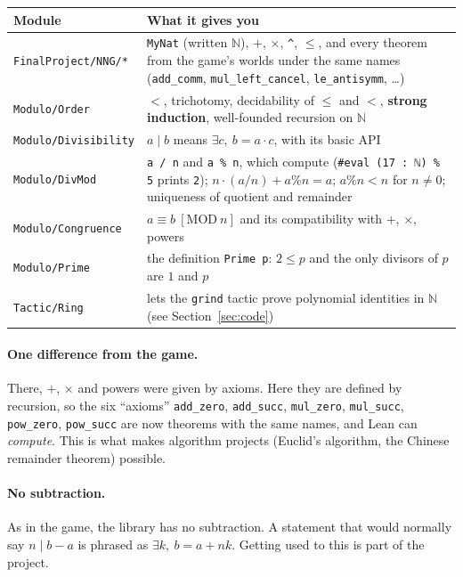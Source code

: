 \documentclass[11pt]{article}
\newcommand{\lean}[1]{\texttt{#1}}
\newcommand{\N}{\ensuremath{\mathbb{N}}}
\newcommand{\dvd}{\ensuremath{\mid}}
\begin{document}
\begin{tabularx}{\textwidth}{@{}l>{\raggedright\arraybackslash}X@{}}
\toprule
Module & What it gives you \\
\midrule
\lean{FinalProject/NNG/*} & \lean{MyNat} (written \N), $+$, $\times$, \lean{\textasciicircum}, $\le$, and every
  theorem from the game's worlds under the same names (\lean{add\_comm},
  \lean{mul\_left\_cancel}, \lean{le\_antisymm}, \dots) \\
\lean{Modulo/Order} & $<$, trichotomy, decidability of $\le$ and $<$, \textbf{strong induction},
  well-founded recursion on \N \\
\lean{Modulo/Divisibility} & $a \dvd b$ means $\exists c,\ b = a \cdot c$, with its basic API \\
\lean{Modulo/DivMod} & \lean{a / n} and \lean{a \% n}, which compute (\lean{\#eval (17 : ℕ) \% 5}
  prints \lean{2}); $n \cdot (a / n) + a \% n = a$; $a \% n < n$ for $n \ne 0$; uniqueness of
  quotient and remainder \\
\lean{Modulo/Congruence} & $a \equiv b \ [\mathrm{MOD}\ n]$ and its compatibility with $+$, $\times$,
  powers \\
\lean{Modulo/Prime} & the definition \lean{Prime p}: $2 \le p$ and the only divisors of $p$ are
  $1$ and $p$ \\
\lean{Tactic/Ring} & lets the \lean{grind} tactic prove polynomial identities in \N{} (see
  Section~\ref{sec:code}) \\
\bottomrule
\end{tabularx}

\paragraph{One difference from the game.} There, $+$, $\times$ and powers were given by axioms.
Here they are defined by recursion, so the six ``axioms'' \lean{add\_zero}, \lean{add\_succ},
\lean{mul\_zero}, \lean{mul\_succ}, \lean{pow\_zero}, \lean{pow\_succ} are now theorems with the
same names, and Lean can \emph{compute}. This is what makes algorithm projects (Euclid's
algorithm, the Chinese remainder theorem) possible.

\paragraph{No subtraction.} As in the game, the library has no subtraction. A statement that
would normally say $n \dvd b - a$ is phrased as $\exists k,\ b = a + n k$. Getting used to this
is part of the project.
\end{document}
